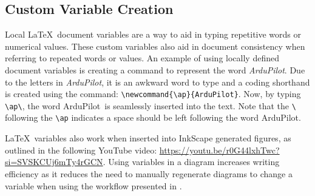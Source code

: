 \subsection{Custom Variable Creation}
\newcommand{\ap}{ArduPilot}
Local \LaTeX\ document variables are a way to aid in typing repetitive words or numerical values. 
These custom variables also aid in document consistency when referring to repeated words or values. 
An example of using locally defined document variables is creating a command to represent the word \textit{ArduPilot}. 
Due to the letters in \textit{ArduPilot}, it is an awkward word to type and a coding shorthand is created using the command: \verb*|\newcommand{\ap}{ArduPilot}|. 
Now, by typing \verb*|\ap\|, the word \ap\ is seamlessly inserted into the text. 
Note that the \verb*|\| following the \verb*|\ap| indicates a space should be left following the word \ap.

\LaTeX\ variables also work when inserted into InkScape generated figures, as outlined in the following YouTube video: \url{https://youtu.be/r0G44lxhTwc?si=SVSKCUj6mTy4rGCN}. 
Using variables in a diagram increases writing efficiency as it reduces the need to manually regenerate diagrams to change a variable when using the workflow presented in . 

